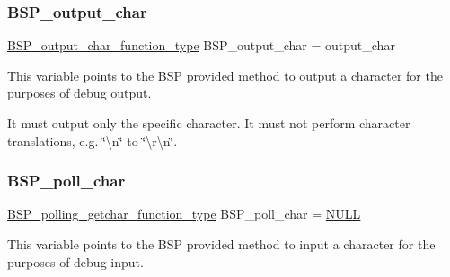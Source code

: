 \subsubsection{\texorpdfstring{BSP\_output\_char}{BSP\_output\_char}}
{\footnotesize\ttfamily \mbox{\hyperlink{bspIo_8h_a0b0dff1c3d35110ae303b4098c60dc14}{B\+S\+P\+\_\+output\+\_\+char\+\_\+function\+\_\+type}} B\+S\+P\+\_\+output\+\_\+char = output\+\_\+char}

This variable points to the B\+SP provided method to output a character for the purposes of debug output.

It must output only the specific character. It must not perform character translations, e.\+g. \char`\"{}\textbackslash{}n\char`\"{} to \char`\"{}\textbackslash{}r\textbackslash{}n\char`\"{}. \mbox{\label{powerpc_2qoriq_2console_2console-config_8c_ae5846eecdfa8f2813504371bf01c29b0}} 
\subsubsection{\texorpdfstring{BSP\_poll\_char}{BSP\_poll\_char}}
{\footnotesize\ttfamily \mbox{\hyperlink{bspIo_8h_a132b9ceff428a634ece5dfaac7ef1006}{B\+S\+P\+\_\+polling\+\_\+getchar\+\_\+function\+\_\+type}} B\+S\+P\+\_\+poll\+\_\+char = \mbox{\hyperlink{bestcomm__api_8h_a872bb74de61c3689ccd5b41873fce42c}{N\+U\+LL}}}

This variable points to the B\+SP provided method to input a character for the purposes of debug input. 